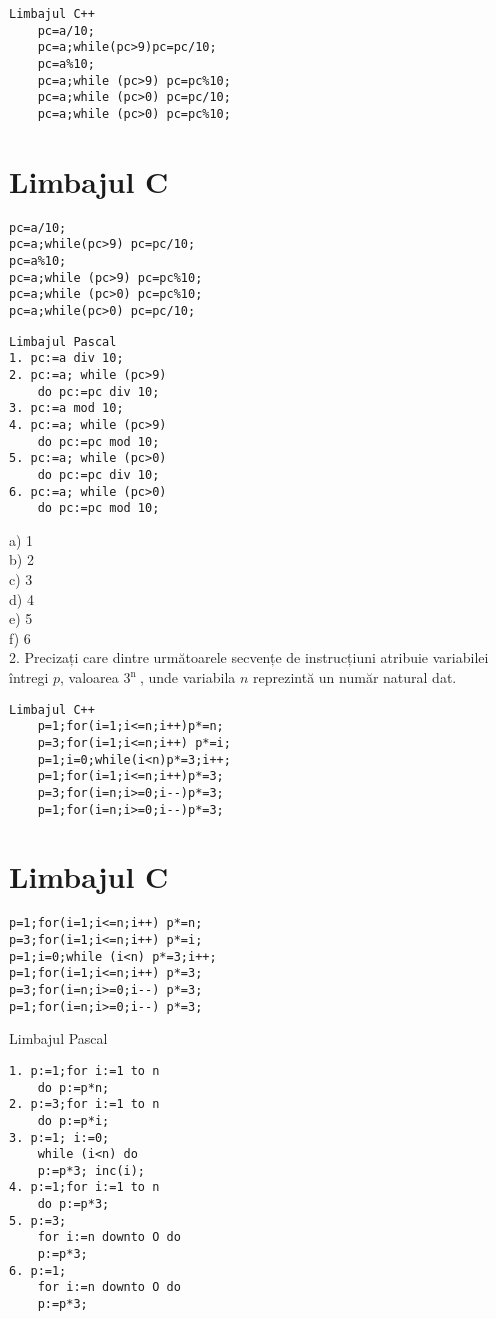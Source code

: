 \begin{verbatim}
Limbajul C++
    pc=a/10;
    pc=a;while(pc>9)pc=pc/10;
    pc=a%10;
    pc=a;while (pc>9) pc=pc%10;
    pc=a;while (pc>0) pc=pc/10;
    pc=a;while (pc>0) pc=pc%10;
\end{verbatim}

\section*{Limbajul C}
\begin{verbatim}
pc=a/10;
pc=a;while(pc>9) pc=pc/10;
pc=a%10;
pc=a;while (pc>9) pc=pc%10;
pc=a;while (pc>0) pc=pc%10;
pc=a;while(pc>0) pc=pc/10;
\end{verbatim}

\begin{verbatim}
Limbajul Pascal
1. pc:=a div 10;
2. pc:=a; while (pc>9)
    do pc:=pc div 10;
3. pc:=a mod 10;
4. pc:=a; while (pc>9)
    do pc:=pc mod 10;
5. pc:=a; while (pc>0)
    do pc:=pc div 10;
6. pc:=a; while (pc>0)
    do pc:=pc mod 10;
\end{verbatim}

a) 1\\
b) 2\\
c) 3\\
d) 4\\
e) 5\\
f) 6\\
2. Precizați care dintre următoarele secvențe de instrucțiuni atribuie variabilei întregi $p$, valoarea $3^{\text {n }}$, unde variabila $n$ reprezintă un număr natural dat.

\begin{verbatim}
Limbajul C++
    p=1;for(i=1;i<=n;i++)p*=n;
    p=3;for(i=1;i<=n;i++) p*=i;
    p=1;i=0;while(i<n)p*=3;i++;
    p=1;for(i=1;i<=n;i++)p*=3;
    p=3;for(i=n;i>=0;i--)p*=3;
    p=1;for(i=n;i>=0;i--)p*=3;
\end{verbatim}

\section*{Limbajul C}
\begin{verbatim}
p=1;for(i=1;i<=n;i++) p*=n;
p=3;for(i=1;i<=n;i++) p*=i;
p=1;i=0;while (i<n) p*=3;i++;
p=1;for(i=1;i<=n;i++) p*=3;
p=3;for(i=n;i>=0;i--) p*=3;
p=1;for(i=n;i>=0;i--) p*=3;
\end{verbatim}

Limbajul Pascal

\begin{verbatim}
1. p:=1;for i:=1 to n
    do p:=p*n;
2. p:=3;for i:=1 to n
    do p:=p*i;
3. p:=1; i:=0;
    while (i<n) do
    p:=p*3; inc(i);
4. p:=1;for i:=1 to n
    do p:=p*3;
5. p:=3;
    for i:=n downto O do
    p:=p*3;
6. p:=1;
    for i:=n downto O do
    p:=p*3;
\end{verbatim}


